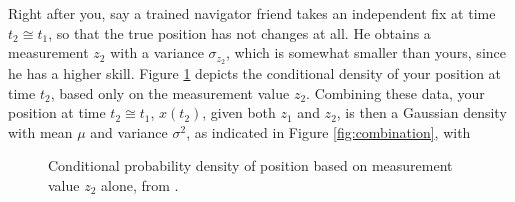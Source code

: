 Right after you, say a trained navigator friend takes an independent fix at time $t_2 \cong t_1$, so that the true position has not changes at all. He obtains a measurement $z_2$ with a variance $\sigma_{z_2}$, which is somewhat smaller than yours, since he has a higher skill. Figure \ref{fig:measurement_z2} depicts the conditional density of your position at time $t_2$, based only on the measurement value $z_2$. Combining these data, your position at time $t_2 \cong t_1$, $x(t_2)$, given both $z_1$ and $z_2$, is then a Gaussian density with mean $\mu$ and variance $\sigma^2$, as indicated in Figure \ref{fig:combination}, with

\begin{figure}
\centering
{}
\caption{Conditional probability density of position based on measurement value $z_2$ alone, from \cite{Maybeck79}.} \label{fig:measurement_z2}
\end{figure}


